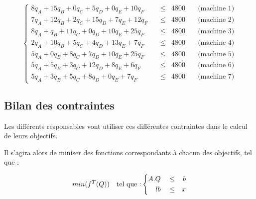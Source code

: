 \documentclass[paper=a4, fontsize=11pt]{report}
\numberwithin{equation}{section}		%
\numberwithin{figure}{section}			%
\numberwithin{table}{section}				%
\begin{document}
\begin{equation}
  \left\{
    \begin{aligned}
8q_A + 15q_B + 0q_C  +  5q_D + 0q_E  + 10q_F \quad & \leq & 4800 & \quad \text{(machine 1)} \\
7q_A + 12q_B + 2q_C  + 15q_D + 7q_E  + 12q_F \quad & \leq & 4800 & \quad \text{(machine 2)} \\
8q_A +   q_B + 11q_C +  0q_D + 10q_E + 25q_F \quad & \leq & 4800 & \quad \text{(machine 3)} \\
2q_A + 10q_B + 5q_C  +  4q_D + 13q_E + 7q_F  \quad & \leq & 4800 & \quad \text{(machine 4)} \\
5q_A +  0q_B + 8q_C  +  7q_D + 10q_E + 25q_F \quad & \leq & 4800 & \quad \text{(machine 5)} \\
5q_A +  5q_B + 3q_C  + 12q_D + 8q_E  + 6q_F  \quad & \leq & 4800 & \quad \text{(machine 6)} \\
5q_A +  3q_B + 5q_C  + 8q_D  + 0q_E  + 7q_F  \quad & \leq & 4800 & \quad \text{(machine 7)} 
    \end{aligned}
  \right.
\label{tps_travail}
\end{equation}

\subsection{Bilan des contraintes}

Les différents responsables vont utiliser ces différentes contraintes dans le calcul de leurs objectifs.

Il s'agira alors de miniser des fonctions correspondants à chacun des objectifs, tel que : 

\begin{equation}
  min(f^T(Q)) \quad \text{tel que :} \quad \\
   \left\{
    \begin{aligned}
A.Q \quad & \leq & b \\
lb \quad & \leq & x \\
    \end{aligned}
  \right.
\end{equation}
\end{document}
